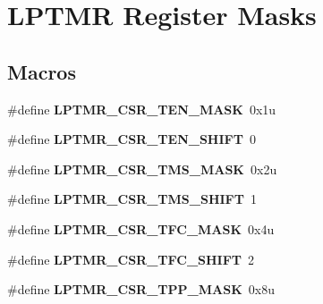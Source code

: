 \hypertarget{group__LPTMR__Register__Masks}{}\section{L\+P\+T\+MR Register Masks}
\label{group__LPTMR__Register__Masks}
\subsection*{Macros}
\begin{DoxyCompactItemize}
\item 
\#define {\bfseries L\+P\+T\+M\+R\+\_\+\+C\+S\+R\+\_\+\+T\+E\+N\+\_\+\+M\+A\+SK}~0x1u\hypertarget{group__LPTMR__Register__Masks_ga4ed197f1cb8d0e954324b4854ff14a83}{}\label{group__LPTMR__Register__Masks_ga4ed197f1cb8d0e954324b4854ff14a83}

\item 
\#define {\bfseries L\+P\+T\+M\+R\+\_\+\+C\+S\+R\+\_\+\+T\+E\+N\+\_\+\+S\+H\+I\+FT}~0\hypertarget{group__LPTMR__Register__Masks_gada00f24f79b11a91e8404b4531d66733}{}\label{group__LPTMR__Register__Masks_gada00f24f79b11a91e8404b4531d66733}

\item 
\#define {\bfseries L\+P\+T\+M\+R\+\_\+\+C\+S\+R\+\_\+\+T\+M\+S\+\_\+\+M\+A\+SK}~0x2u\hypertarget{group__LPTMR__Register__Masks_ga57ee593a57d844d7bb4b87c127765558}{}\label{group__LPTMR__Register__Masks_ga57ee593a57d844d7bb4b87c127765558}

\item 
\#define {\bfseries L\+P\+T\+M\+R\+\_\+\+C\+S\+R\+\_\+\+T\+M\+S\+\_\+\+S\+H\+I\+FT}~1\hypertarget{group__LPTMR__Register__Masks_gaeac406c6a48e15c6ec5784fb891b51b6}{}\label{group__LPTMR__Register__Masks_gaeac406c6a48e15c6ec5784fb891b51b6}

\item 
\#define {\bfseries L\+P\+T\+M\+R\+\_\+\+C\+S\+R\+\_\+\+T\+F\+C\+\_\+\+M\+A\+SK}~0x4u\hypertarget{group__LPTMR__Register__Masks_gaca581598c0f319b0002deda730479842}{}\label{group__LPTMR__Register__Masks_gaca581598c0f319b0002deda730479842}

\item 
\#define {\bfseries L\+P\+T\+M\+R\+\_\+\+C\+S\+R\+\_\+\+T\+F\+C\+\_\+\+S\+H\+I\+FT}~2\hypertarget{group__LPTMR__Register__Masks_gaee3d1b59f30f6217f1f74b18cf973c4a}{}\label{group__LPTMR__Register__Masks_gaee3d1b59f30f6217f1f74b18cf973c4a}

\item 
\#define {\bfseries L\+P\+T\+M\+R\+\_\+\+C\+S\+R\+\_\+\+T\+P\+P\+\_\+\+M\+A\+SK}~0x8u\hypertarget{group__LPTMR__Register__Masks_ga020eee1550f2943c10d51f8b56930e62}{}\label{group__LPTMR__Register__Masks_ga020eee1550f2943c10d51f8b56930e62}


\end{DoxyCompactItemize}
